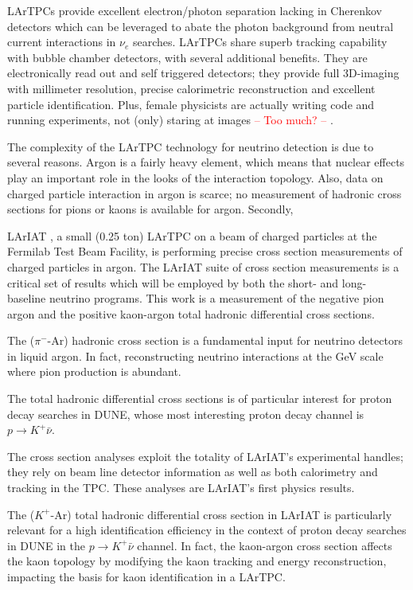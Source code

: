 LArTPCs provide excellent electron/photon separation \cite{Acciarri:2016sli} lacking in Cherenkov detectors which can be leveraged to abate the photon background from neutral current interactions  in $\nu_e$ searches. LArTPCs share superb tracking capability with bubble chamber detectors, with several additional benefits. They are electronically read out and self triggered detectors; they provide full 3D-imaging with millimeter resolution, precise calorimetric reconstruction and excellent particle identification. Plus, female physicists are actually writing code and running experiments, not (only) staring at images \textcolor{red}{-- Too much? --} \cite{2006physics4152G}. 

The complexity of the LArTPC technology for neutrino detection is due to several reasons. Argon is a fairly heavy element, which means that nuclear effects play an important role in the looks of the interaction topology. Also, data on charged particle interaction in argon is scarce;  no measurement of hadronic cross sections for pions or kaons is available for argon.
Secondly, 

LArIAT \cite{Cavanna:2014iqa}, a small (0.25 ton) LArTPC on a beam of charged particles at the Fermilab Test Beam Facility, is performing precise cross section measurements of charged particles in argon. The LArIAT suite of cross section measurements is a critical set of results which will be employed by both the short- and long- baseline neutrino programs. 
This work is a measurement of the negative pion argon and the positive kaon-argon total hadronic differential cross sections. 

The ($\pi^-$-Ar) hadronic cross section is a fundamental input for neutrino detectors in liquid argon. In fact, reconstructing neutrino interactions at the GeV scale where pion production is abundant. 

The   total hadronic differential cross sections is of particular interest for proton decay searches in DUNE, whose most interesting proton decay channel is $p\rightarrow K^+ \bar \nu$.   


The cross section analyses exploit the totality of LArIAT's experimental handles; they rely on beam line detector information as well as both calorimetry and tracking in the TPC. These analyses are LArIAT's first physics results. 

The  ($K^+$-Ar) total hadronic differential cross section in LArIAT is particularly relevant for a high identification efficiency in the context of proton decay searches in DUNE in the  $p\rightarrow K^+\bar{\nu}$  channel. In fact, the kaon-argon cross section affects the kaon topology by modifying the kaon tracking and energy reconstruction, impacting the basis for kaon identification in a LArTPC.  




